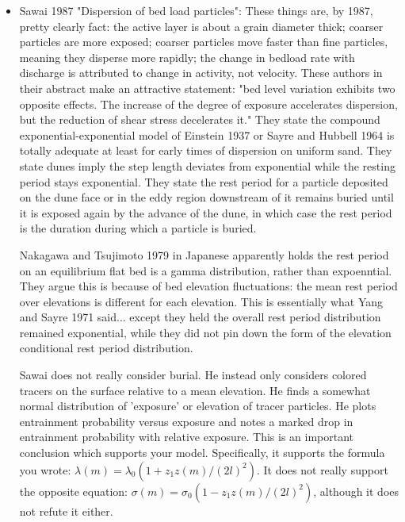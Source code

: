 \documentclass{article}
\begin{document}
\begin{itemize}
\item Sawai 1987 "Dispersion of bed load particles":
These things are, by 1987, pretty clearly fact: the active layer is about a grain diameter thick; coarser particles are more exposed; coarser particles move faster than fine particles, meaning they disperse more rapidly; the change in bedload rate with discharge is attributed to change in activity, not velocity.
These authors in their abstract make an attractive statement: "bed level variation exhibits two opposite effects. The increase of the degree of exposure accelerates dispersion, but the reduction of shear stress decelerates it."
They state the compound exponential-exponential model of Einstein 1937 or Sayre and Hubbell 1964 is totally adequate at least for early times of dispersion on uniform sand. 
They state dunes imply the step length deviates from exponential while the resting period stays exponential. 
They state the rest period for a particle deposited on the dune face or in the eddy region downstream of it remains buried until it is exposed again by the advance of the dune, in which case the rest period is the duration during which a particle is buried. 

Nakagawa and Tsujimoto 1979 in Japanese apparently holds the rest period on an equilibrium flat bed is a gamma distribution, rather than expoenntial. They argue this is because of bed elevation fluctuations: the mean rest period over elevations is different for each elevation. This is essentially what Yang and Sayre 1971 said... except they held the overall rest period distribution remained exponential, while they did not pin down the form of the elevation conditional rest period distribution. 

Sawai does not really consider burial. He instead only considers colored tracers on the surface relative to a mean elevation. 
He finds a somewhat normal distribution of 'exposure' or elevation of tracer particles. 
He plots entrainment probability versus exposure and notes a marked drop in entrainment probability with relative exposure. This is an important conclusion which supports your model. Specifically, it supports the formula you wrote: $\lambda(m) = \lambda_0(1+z_1z(m)/(2l)^2). $ It does not really support the opposite equation: $\sigma(m) = \sigma_0(1-z_1z(m)/(2l)^2)$, although it does not refute it either. 


\end{itemize}
\end{document}
